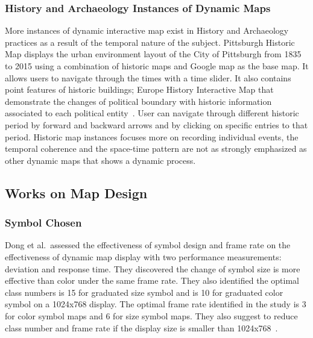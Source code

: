 \documentclass[hidelinks,12pt]{article}
\begin{document}
\subsubsection{History and Archaeology Instances of Dynamic Maps}
More instances of dynamic interactive map exist in History and
Archaeology practices as a result of the temporal nature of the
subject. Pittsburgh Historic Map displays the urban environment layout
of the City of Pittsburgh from 1835 to 2015 using a combination of
historic maps and Google map as the base map. It allows users to
navigate through the times with a time slider. It also contains point
features of historic buildings\cite{EsriHistory2015}; Europe History
Interactive Map that demonstrate the changes of political boundary
with historic information associated to each political
entity~\cite{Worldology2009}. User can navigate through different
historic period by forward and backward arrows and by clicking on
specific entries to that period. Historic map instances focuses more
on recording individual events, the temporal coherence and the
space-time pattern are not as strongly emphasized as other dynamic
maps that shows a dynamic process.

\subsection{Works on Map Design}\label{mapDesign}
\subsubsection{Symbol Chosen}
Dong et al.\ assessed the effectiveness of symbol design and frame
rate on the effectiveness of dynamic map display with two performance
measurements: deviation and response time. They discovered the change
of symbol size is more effective than color under the same frame
rate. They also identified the optimal class numbers is 15 for
graduated size symbol and is 10 for graduated color symbol on a
1024x768 display. The optimal frame rate identified in the study is 3
for color symbol maps and 6 for size symbol maps. They also suggest to
reduce class number and frame rate if the display size is smaller than
1024x768~\cite{doi:10.1559/1523040639298}.
\end{document}

